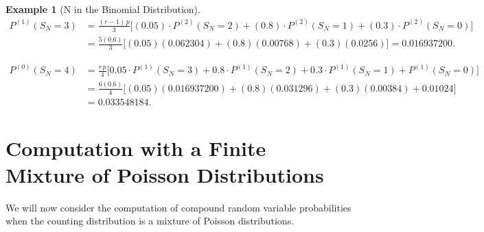 \documentclass[11pt]{amsart}
\theoremstyle{definition}
\newtheorem{example}{Example}
\theoremstyle{plain}
\begin{document}
\begin{example}[N in the Binomial Distribution]
\begin{align*}
P^{(1)}(S_N = 3)
    &= \frac{(r-1)\,p}{3}
       \bigl[(0.05)\cdot P^{(2)}(S_N = 2) + (0.8)\cdot P^{(2)}(S_N = 1)
       + (0.3)\cdot P^{(2)}(S_N = 0)\bigr] \\
    &= \frac{5(0.6)}{3}
       \bigl[(0.05)(0.062304) + (0.8)(0.00768) + (0.3)(0.0256)\bigr]
     = 0.016937200.
\end{align*}

\begin{align*}
P^{(0)}(S_N = 4)
    &= \frac{r\,p}{4}
       \bigl[0.05 \cdot P^{(1)}(S_N = 3) + 0.8 \cdot P^{(1)}(S_N = 2)
       + 0.3 \cdot P^{(1)}(S_N = 1) + P^{(1)}(S_N = 0)\bigr] \\
    &= \frac{6(0.6)}{4}
       \bigl[(0.05)(0.016937200) + (0.8)(0.031296)
       + (0.3)(0.00384) + 0.01024\bigr] \\
    &= \boxed{0.033548184}.
\end{align*}
\end{example}

\section{Computation with a Finite Mixture of Poisson Distributions}

We will now consider the computation of compound random variable probabilities when the
counting distribution is a mixture of Poisson distributions.
\end{document}
